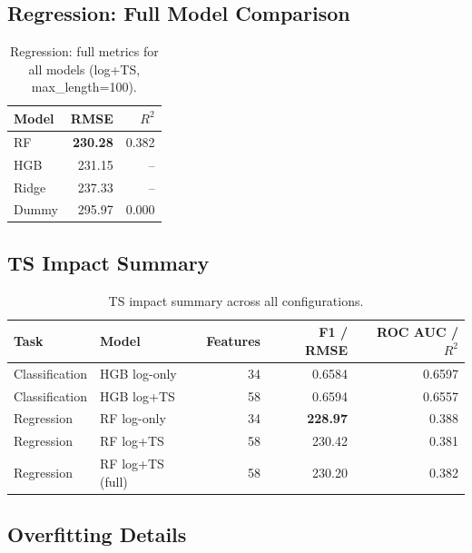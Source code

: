 \documentclass[runningheads]{llncs}
\begin{document}
\subsection{Regression: Full Model Comparison}

\begin{table}[H]
    \centering
    \caption{Regression: full metrics for all models (log+TS, max\_length=100).}
    \label{tab:app-regression}
    \begin{tabularx}{0.75\textwidth}{lrr}
        \toprule
        Model & RMSE & $R^2$ \\
        \midrule
        RF  & \textbf{230.28} & 0.382 \\
        HGB & 231.15 & -- \\
        Ridge & 237.33 & -- \\
        Dummy & 295.97 & 0.000 \\
        \bottomrule
    \end{tabularx}
\end{table}

\subsection{TS Impact Summary}

\begin{table}[H]
    \centering
    \caption{TS impact summary across all configurations.}
    \label{tab:app-ts-impact}
    \begin{tabularx}{\textwidth}{llrrr}
        \toprule
        Task & Model & Features & F1 / RMSE & ROC AUC / $R^2$ \\
        \midrule
        Classification & HGB log-only & 34 & 0.6584 & 0.6597 \\
        Classification & HGB log+TS & 58 & 0.6594 & 0.6557 \\
        \midrule
        Regression & RF log-only & 34 & \textbf{228.97} & 0.388 \\
        Regression & RF log+TS & 58 & 230.42 & 0.381 \\
        Regression & RF log+TS (full) & 58 & 230.20 & 0.382 \\
        \bottomrule
    \end{tabularx}
\end{table}

\subsection{Overfitting Details}
\end{document}
